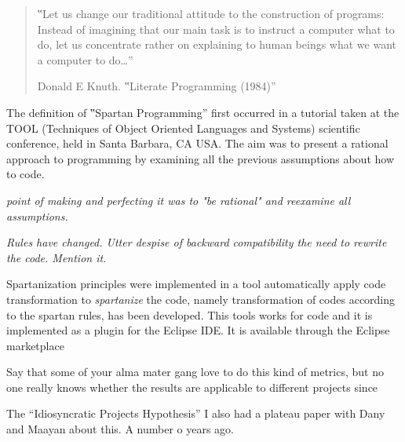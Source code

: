 \begin{quote}
  ‟Let us change our traditional attitude to the construction of programs:
  Instead of imagining that our main task is to instruct a computer what to do,
  let us concentrate rather on explaining to human beings what we want a computer
  to do…”
  \begin{flushright}
   \upshape Donald E Knuth. ‟Literate Programming (1984)”
  \end{flushright}
\end{quote}


The definition of ‟Spartan Programming” first occurred in a tutorial taken at
the TOOL (Techniques of Object Oriented Languages and Systems) scientific conference,
held in Santa Barbara, CA USA. %
The aim was to present a rational approach to programming by examining all the previous
assumptions about how to code.

\emph{point of making and perfecting it was to "be rational" and
reexamine all assumptions.}

\emph{Rules have changed.
Utter despise of backward compatibility the need to rewrite the code.
Mention it.}


Spartanization principles were implemented in a tool automatically apply code
transformation to \emph{spartanize} the code, namely transformation of codes
according to the spartan rules, has been developed.
This tools works for \Java code and it is implemented as a plugin for the Eclipse
IDE\@. It is available through the Eclipse marketplace

Say that some of your alma mater gang love to do this kind of metrics, but
no one really knows whether the results are applicable to different projects
since~\cite{Turnu:Concas:Marchesi:Tonelli:11}

The ``Idiosyncratic Projects Hypothesis'' I also had a plateau paper with
Dany and Maayan about this. A number o years ago.\cite{Gil:2011:Goldstein:Moshkovich:2011}

